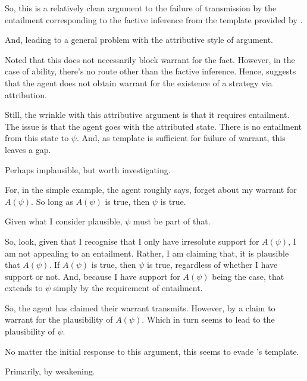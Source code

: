 \documentclass[10pt]{article}
\begin{document}
\begin{note}
  So, this is a relatively clean argument to the failure of transmission by the entailment corresponding to the factive inference from the template provided by \citeauthor{Wright:2011wn}.

  And, leading to a general problem with the attributive style of argument.

  Noted that this does not necessarily block warrant for the fact.
  However, in the case of ability, there's no route other than the factive inference.
  Hence, suggests that the agent does not obtain warrant for the existence of a strategy via attribution.

  Still, the wrinkle with this attributive argument is that it requires entailment.
  The issue is that the agent goes with the attributed state.
  There is no entailment from this state to \(\psi\).
  And, as template is sufficient for failure of warrant, this leaves a gap.

  Perhaps implausible, but worth investigating.

  For, in the simple example, the agent roughly says, forget about my warrant for \(A(\psi)\).
  So long as \(A(\psi)\) is true, then \(\psi\) is true.

  Given what I consider plausible, \(\psi\) must be part of that.


  So, look, given that I recognise that I only have irresolute support for \(A(\psi)\), I am not appealing to an entailment.
  Rather, I am claiming that, it is plausible that \(A(\psi)\).
  If \(A(\psi)\) is true, then \(\psi\) is true, regardless of whether I have support or not.
  And, because I have support for \(A(\psi)\) being the case, that extends to \(\psi\) simply by the requirement of entailment.

  So, the agent has claimed their warrant transmits.
  However, by a claim to warrant for the plausibility of \(A(\psi)\).
  Which in turn seems to lead to the plausibility of \(\psi\).

  No matter the initial response to this argument, this seems to evade \citeauthor{Wright:2011wn}'s template.

  Primarily, by weakening.



\end{note}
\end{document}

